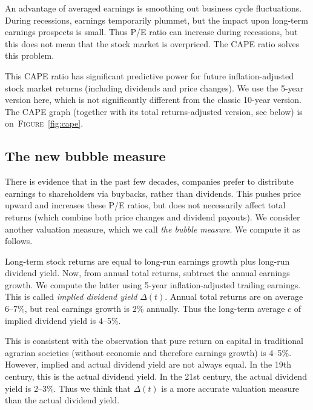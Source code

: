 \documentclass[12pt]{amsart}
\theoremstyle{definition}
\begin{document}
An advantage of averaged earnings is smoothing out business cycle fluctuations. During recessions, earnings temporarily plummet, but the impact upon long-term earnings prospects is small. Thus P/E ratio can increase during recessions, but this does not mean that the stock market is overpriced. The CAPE ratio solves this problem. 

This CAPE ratio has significant predictive power for future inflation-adjusted stock market returns (including dividends and price changes). We use the 5-year version here, which is not significantly different from the classic 10-year version. The CAPE graph (together with its total returns-adjusted version, see below) is on~\textsc{Figure}~\ref{fig:cape}. 

\subsection{The new bubble measure} There is evidence that in the past few decades, companies prefer to distribute earnings to shareholders via buybacks, rather than dividends. This pushes price upward and increases these P/E ratios, but does not necessarily affect total returns (which combine both price changes and dividend payouts). We consider another valuation measure, which we call {\it the bubble measure}. We compute it as follows.

Long-term stock returns are equal to long-run earnings growth plus long-run dividend yield. Now, from annual total returns, subtract the annual earnings growth. We compute the latter using 5-year inflation-adjusted trailing earnings. This is called {\it implied dividend yield} $\Delta(t)$. Annual total returns are on average 6--7\%, but real earnings growth is 2\% annually. Thus the long-term average $c$ of implied dividend yield is 4--5\%. 

This is consistent with the observation that pure return on capital in traditional agrarian societies (without economic and therefore earnings growth) is 4--5\%. However, implied and actual dividend yield are not always equal. In the 19th century, this is the actual dividend yield. In the 21st century, the actual dividend yield is 2--3\%. Thus we think that $\Delta(t)$ is a more accurate valuation measure than the actual dividend yield. 
\end{document}
